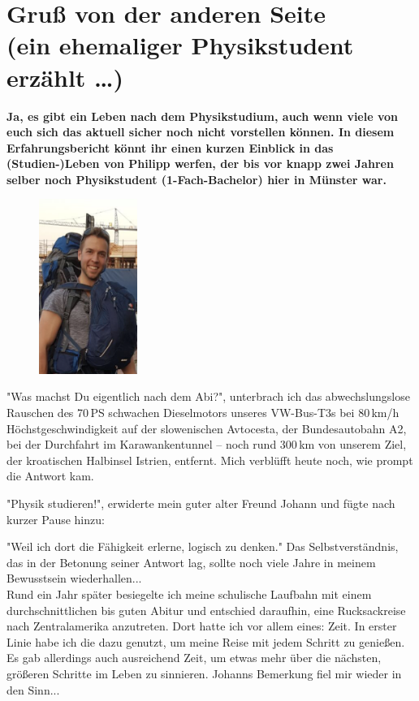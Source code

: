 \section[Gruß von der anderen Seite (ein ehemaliger Physikstudent erzählt \dots)]{Gruß von der anderen Seite\\(ein ehemaliger Physikstudent erzählt \dots)}
\textbf{
Ja, es gibt ein Leben nach dem Physikstudium, auch wenn viele von euch sich das aktuell sicher noch nicht vorstellen können.
In diesem Erfahrungsbericht könnt ihr einen kurzen Einblick in das (Studien-)Leben von Philipp werfen, der bis vor knapp zwei Jahren selber noch Physikstudent (1-Fach-Bachelor) hier in Münster war.
}


\begin{multicols}{2}

\begin{multicols}{2}
\begin{figure}
	\includegraphics[width=3.2cm]{res/philipp_van_wickevoort_crommelin.PNG}
\end{figure}

"Was machst Du eigentlich nach dem Abi?", unterbrach ich das abwechslungslose Rauschen des 70\,PS schwachen Dieselmotors unseres
VW-Bus-T3s bei 80\,km/h Höchstgeschwindigkeit auf der slowenischen Avtocesta, der Bundesautobahn A2, bei der Durchfahrt im
Karawankentunnel – noch rund 300\,km von unserem Ziel, der kroatischen Halbinsel Istrien, entfernt.
Mich verblüfft heute noch, wie prompt die Antwort kam.

"Physik studieren!", erwiderte mein guter alter Freund Johann und fügte nach kurzer Pause hinzu:
\end{multicols}
"Weil ich dort die Fähigkeit erlerne, logisch zu denken."
Das Selbstverständnis, das in der Betonung seiner Antwort lag, sollte noch viele Jahre in meinem Bewusstsein wiederhallen... \\ 

Rund ein Jahr später besiegelte ich meine schulische Laufbahn mit einem durchschnittlichen bis guten Abitur und entschied daraufhin,
eine Rucksackreise nach Zentralamerika anzutreten.
Dort hatte ich vor allem eines: Zeit. In erster Linie habe ich die dazu genutzt, um meine Reise mit jedem Schritt zu genießen.
Es gab allerdings auch ausreichend Zeit, um etwas mehr über die nächsten, größeren Schritte im Leben zu sinnieren. Johanns Bemerkung fiel mir wieder in den Sinn... \\ 


\end{multicols}
